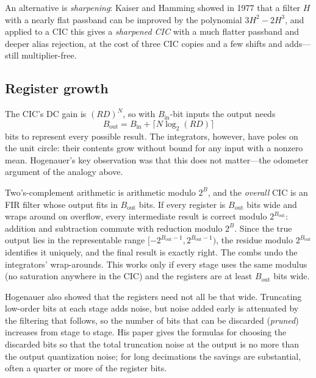 An alternative is \emph{sharpening}: Kaiser and Hamming showed in 1977 that a filter $H$ with a
nearly flat passband can be improved by the polynomial $3H^2-2H^3$, and applied to a CIC this gives a
\emph{sharpened CIC} with a much flatter passband and deeper alias rejection, at the cost of three
CIC copies and a few shifts and adds---still multiplier-free.

\subsection{Register growth}

The CIC's DC gain is $(RD)^N$, so with $B_{\text{in}}$-bit inputs the output needs
\begin{equation}
B_{\text{out}}=B_{\text{in}}+\bigl\lceil N\log_2(RD)\bigr\rceil
\label{eq:ch06:cicgrowth}
\end{equation}
bits to represent every possible result. The integrators, however, have poles on the unit circle:
their contents grow without bound for any input with a nonzero mean. Hogenauer's key observation was
that this does not matter---the odometer argument of the analogy above.


\begin{deeper}
Two's-complement arithmetic is arithmetic modulo $2^B$, and the \emph{overall} CIC is an FIR filter
whose output fits in $B_{\text{out}}$ bits. If every register is $B_{\text{out}}$ bits wide and wraps
around on overflow, every intermediate result is correct modulo $2^{B_{\text{out}}}$: addition and
subtraction commute with reduction modulo $2^B$. Since the true output lies in the representable
range $[-2^{B_{\text{out}}-1},2^{B_{\text{out}}-1})$, the residue modulo $2^{B_{\text{out}}}$
identifies it uniquely, and the final result is exactly right. The combs undo the integrators'
wrap-arounds. This works only if every stage uses the same modulus (no saturation anywhere in the
CIC) and the registers are at least $B_{\text{out}}$ bits wide.
\end{deeper}

Hogenauer also showed that the registers need not all be that wide. Truncating low-order bits at
each stage adds noise, but noise added early is attenuated by the filtering that follows, so the
number of bits that can be discarded (\emph{pruned}) increases from stage to stage. His paper gives
the formulas for choosing the discarded bits so that the total truncation noise at the output is
no more than the output quantization noise; for long decimations the savings are substantial,
often a quarter or more of the register bits.

